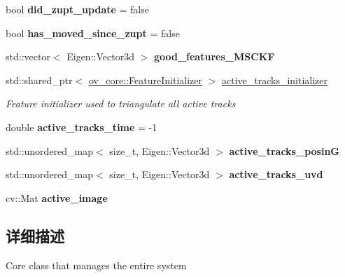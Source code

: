 \begin{DoxyCompactItemize}
bool {\bfseries did\+\_\+zupt\+\_\+update} = false
\item 
\mbox{\label{classov__msckf_1_1VioManager_a3450b4297050f1018765c7939bf00d7f}} 
bool {\bfseries has\+\_\+moved\+\_\+since\+\_\+zupt} = false
\item 
\mbox{\label{classov__msckf_1_1VioManager_a40926fd6cbd206a7e87fc3042782f222}} 
std\+::vector$<$ Eigen\+::\+Vector3d $>$ {\bfseries good\+\_\+features\+\_\+\+M\+S\+C\+KF}
\item 
\mbox{\label{classov__msckf_1_1VioManager_a7a541d7d6baedd02147a851436f897c0}} 
std\+::shared\+\_\+ptr$<$ \hyperlink{classov__core_1_1FeatureInitializer}{ov\+\_\+core\+::\+Feature\+Initializer} $>$ \hyperlink{classov__msckf_1_1VioManager_a7a541d7d6baedd02147a851436f897c0}{active\+\_\+tracks\+\_\+initializer}
\begin{DoxyCompactList}\small\item\em Feature initializer used to triangulate all active tracks \end{DoxyCompactList}\item 
\mbox{\label{classov__msckf_1_1VioManager_a27b558310fe30c4396ce13bcaae50bbc}} 
double {\bfseries active\+\_\+tracks\+\_\+time} = -\/1
\item 
\mbox{\label{classov__msckf_1_1VioManager_a19929a92cf2148f4854ee5741bcaed96}} 
std\+::unordered\+\_\+map$<$ size\+\_\+t, Eigen\+::\+Vector3d $>$ {\bfseries active\+\_\+tracks\+\_\+posinG}
\item 
\mbox{\label{classov__msckf_1_1VioManager_ac573da3687258c50f21c2c973f6554e0}} 
std\+::unordered\+\_\+map$<$ size\+\_\+t, Eigen\+::\+Vector3d $>$ {\bfseries active\+\_\+tracks\+\_\+uvd}
\item 
\mbox{\label{classov__msckf_1_1VioManager_a2b1138ae43c6c7adc9c79ac0639a637c}} 
cv\+::\+Mat {\bfseries active\+\_\+image}
\end{DoxyCompactItemize}


\subsection{详细描述}
Core class that manages the entire system 

